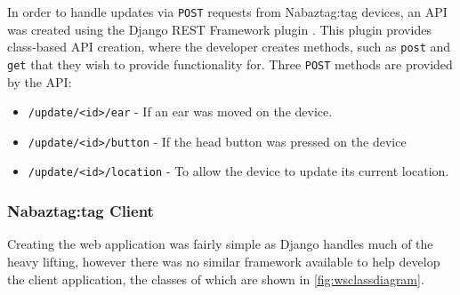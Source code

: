 \documentclass[12pt, a4paper]{article}
\begin{document}
	In order to handle updates via \verb+POST+ requests from Nabaztag:tag devices, an \ac{API} was created using the Django \ac{REST} Framework plugin \parencite{djangorest}. This plugin provides class-based \ac{API} creation, where the developer creates methods, such as \verb+post+ and \verb+get+ that they wish to provide functionality for. Three \verb+POST+ methods are provided by the \ac{API}:
	
	\begin{itemize}
		\item \verb+/update/<id>/ear+ - If an ear was moved on the device.
		\item \verb+/update/<id>/button+ - If the head button was pressed on the device
		\item \verb+/update/<id>/location+ - To allow the device to update its current location.
	\end{itemize}
	

	\subsubsection{Nabaztag:tag Client}
	
	Creating the web application was fairly simple as Django handles much of the heavy lifting, however there was no similar framework available to help develop the client application, the classes of which are shown in \autoref{fig:wsclassdiagram}.
	
\end{document}
